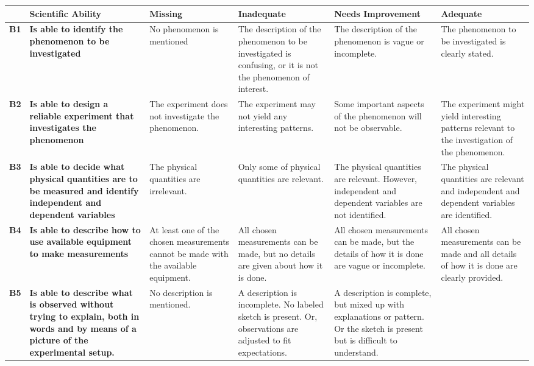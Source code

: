 \begin{landscape}
\begin{longtable}{>{\bfseries}p{0.02\textheight}|>{\bfseries\RaggedRight}p{0.25\textheight}|>{\RaggedRight}p{0.21\textheight}|>{\RaggedRight}p{0.21\textheight}|>{\RaggedRight}p{0.22\textheight}|>{\RaggedRight}p{0.22\textheight}}
		\toprule
		& Scientific Ability
		& Missing & Inadequate & Needs Improvement & Adequate \\ \midrule \endhead
		B1
		& Is able to identify the phenomenon to be investigated
		& No phenomenon is mentioned
		& The description of the phenomenon to be investigated is confusing, or it is not the phenomenon of interest.
		& \midsloppy The description of the phenomenon is vague or incomplete.
		& The phenomenon to be investigated is clearly stated. \\ \midrule
		B2
		& Is able to design a reliable experiment that investigates the phenomenon
		& The experiment does not investigate the phenomenon.
		& The experiment may not yield any interesting patterns.
		& Some important aspects of the phenomenon will not be observable.
		& The experiment might yield interesting patterns relevant to the investigation of the phenomenon. \\ \midrule
		B3
		& Is able to decide what physical quantities are to be measured and identify independent and dependent variables
		& The physical quantities are irrelevant.
		& Only some of physical quantities are relevant.
		& The physical quantities are relevant. However, independent and dependent variables are not identified.
		& The physical quantities are relevant and independent and dependent variables are identified. \\ \midrule
		B4
		& Is able to describe how to use available equipment to make measurements
		& At least one of the chosen measurements cannot be made with the available equipment.
		& All chosen measurements can be made, but no details are given about how it is done.
		& All chosen measurements can be made, but the details of how it is done are vague or incomplete.
		& All chosen measurements can be made and all details of how it is done are clearly provided. \\ \midrule
		B5
		& Is able to describe what is observed without trying to explain, both in words and by means of a picture of the experimental setup.
		& No description is mentioned.
		& A description is incomplete. No labeled sketch is present. Or, observations are adjusted to fit expectations.
		& A description is complete, but mixed up with explanations or pattern. Or the sketch is present but is difficult to understand.

\end{longtable}
\end{landscape}
